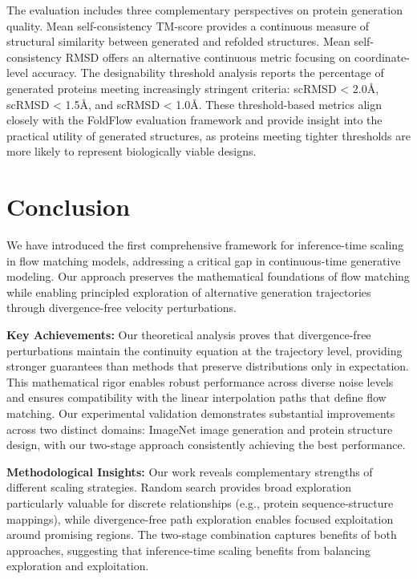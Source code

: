 \documentclass{article}
\begin{document}
The evaluation includes three complementary perspectives on protein generation quality. Mean self-consistency TM-score provides a continuous measure of structural similarity between generated and refolded structures. Mean self-consistency RMSD offers an alternative continuous metric focusing on coordinate-level accuracy. The designability threshold analysis reports the percentage of generated proteins meeting increasingly stringent criteria: scRMSD < 2.0Å, scRMSD < 1.5Å, and scRMSD < 1.0Å. These threshold-based metrics align closely with the FoldFlow evaluation framework and provide insight into the practical utility of generated structures, as proteins meeting tighter thresholds are more likely to represent biologically viable designs.


\section{Conclusion}

We have introduced the first comprehensive framework for inference-time scaling in flow matching models, addressing a critical gap in continuous-time generative modeling. Our approach preserves the mathematical foundations of flow matching while enabling principled exploration of alternative generation trajectories through divergence-free velocity perturbations.

\textbf{Key Achievements:} Our theoretical analysis proves that divergence-free perturbations maintain the continuity equation at the trajectory level, providing stronger guarantees than methods that preserve distributions only in expectation. This mathematical rigor enables robust performance across diverse noise levels and ensures compatibility with the linear interpolation paths that define flow matching. Our experimental validation demonstrates substantial improvements across two distinct domains: ImageNet image generation and protein structure design, with our two-stage approach consistently achieving the best performance.

\textbf{Methodological Insights:} Our work reveals complementary strengths of different scaling strategies. Random search provides broad exploration particularly valuable for discrete relationships (e.g., protein sequence-structure mappings), while divergence-free path exploration enables focused exploitation around promising regions. The two-stage combination captures benefits of both approaches, suggesting that inference-time scaling benefits from balancing exploration and exploitation.
\end{document}
